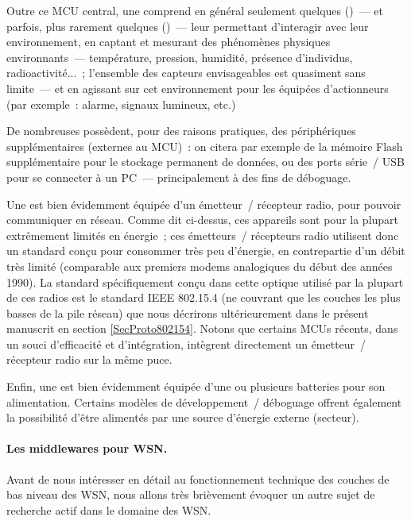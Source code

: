 Outre ce MCU central, une  comprend en général seulement
quelques  ()~--- et parfois, plus
rarement quelques  ()~--- leur
permettant d'interagir avec leur environnement, en captant et mesurant
des phénomènes physiques environnants~--- température, pression, humidité,
présence d'individus, radioactivité...~; l'ensemble des capteurs
envisageables est quasiment sans limite~--- et en agissant sur
cet environnement pour les  équipées d'actionneurs
(par exemple~: alarme, signaux lumineux, etc.)

De nombreuses  possèdent, pour des raisons pratiques, des
périphériques supplémentaires (externes au MCU)~: on citera par exemple
de la mémoire Flash supplémentaire pour le stockage permanent de
données, ou des ports série~/ USB pour se connecter à un PC~---
principalement à des fins de déboguage.

Une  est bien évidemment équipée d'un émetteur~/
récepteur radio, pour pouvoir communiquer en réseau. Comme dit
ci-dessus, ces appareils sont pour la plupart extrêmement limités
en énergie~; ces émetteurs~/ récepteurs radio utilisent donc un
standard conçu pour consommer très peu d'énergie, en contrepartie
d'un débit très limité (comparable aux premiers modems analogiques du
début des années 1990). La standard spécifiquement conçu dans cette optique
utilisé par la plupart de ces radios est le standard IEEE 802.15.4
\cite{IEEE802154-2011} (ne couvrant que les couches les plus basses
de la pile réseau) que nous décrirons ultérieurement dans le
présent manuscrit en section \vref{SecProto802154}. Notons que
certains MCUs récents, dans un souci d'efficacité et d'intégration,
intègrent directement un émetteur~/ récepteur radio sur la même puce.

Enfin, une  est bien évidemment équipée d'une ou plusieurs
batteries pour son alimentation. Certains modèles de développement~/
déboguage offrent également la possibilité d'être alimentés par une
source d'énergie externe (secteur).

\paragraph{Les middlewares pour WSN.}
\label{ParMiddlewares}

Avant de nous intéresser en détail au fonctionnement technique des couches
de bas niveau des WSN, nous allons très brièvement évoquer un autre
sujet de recherche actif dans le domaine des WSN.

